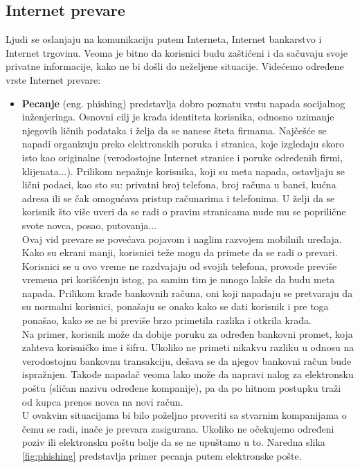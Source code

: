 \documentclass[a4paper]{article}
\begin{document}
\subsection{Internet prevare}
\label{subsec:podnaslovIP2}
Ljudi se oslanjaju na komunikaciju putem Interneta, Internet bankarstvo i Internet trgovinu. Veoma je bitno da korisnici budu zaštićeni i da sačuvaju svoje privatne informacije, kako ne bi došli do neželjene situacije. Videćemo određene vrste Internet prevare:
\begin{itemize}
\item\textbf{Pecanje} (eng. phishing) predstavlja dobro poznatu vrstu napada socijalnog inženjeringa. Osnovni cilj je krađa identiteta korisnika, odnosno uzimanje njegovih ličnih podataka i želja da se nanese šteta firmama. Najčešće se napadi organizuju preko elektronskih poruka i stranica, koje izgledaju skoro isto kao originalne (verodostojne Internet stranice i poruke određenih firmi, klijenata...). Prilikom nepažnje korisnika, koji su meta napada, ostavljaju se lični podaci, kao sto su: privatni broj telefona, broj računa u banci, kućna adresa ili se čak omogućava pristup računarima i telefonima. U želji da se korisnik što više uveri da se radi o pravim stranicama nude mu se poprilične svote novca, posao, putovanja...\\Ovaj vid prevare se povećava pojavom i naglim razvojem mobilnih uređaja. Kako su ekrani manji, korisnici teže mogu da primete da se radi o prevari. Korisnici se u ovo vreme ne razdvajaju od svojih telefona, provode previše vremena pri korišćenju istog, pa samim tim je mnogo lakše da budu meta napada. Prilikom krađe bankovnih računa, oni koji napadaju se pretvaraju da su normalni korisnici, ponašaju se onako kako se dati korisnik i pre toga ponašao, kako se ne bi previše brzo primetila razlika i otkrila krađa. 
\\Na primer, korisnik može da dobije poruku za određen bankovni promet, koja zahteva korisničko ime i šifru. Ukoliko ne primeti nikakvu razliku u odnosu na verodostojnu bankovnu transakciju, dešava se da njegov bankovni račun bude ispražnjen. Takođe napadač veoma lako može da napravi nalog za elektronsku poštu (sličan nazivu određene kompanije), pa da po hitnom postupku traži od kupca prenos novca na novi račun. \\U ovakvim situacijama bi bilo poželjno proveriti sa stvarnim kompanijama o čemu se radi, inače je prevara zasigurana. Ukoliko ne očekujemo određeni poziv ili elektronsku poštu bolje da se ne upuštamo u to. Naredna slika \ref{fig:phishing} predstavlja primer pecanja putem elektronske pošte.
\end{itemize}
\end{document}
